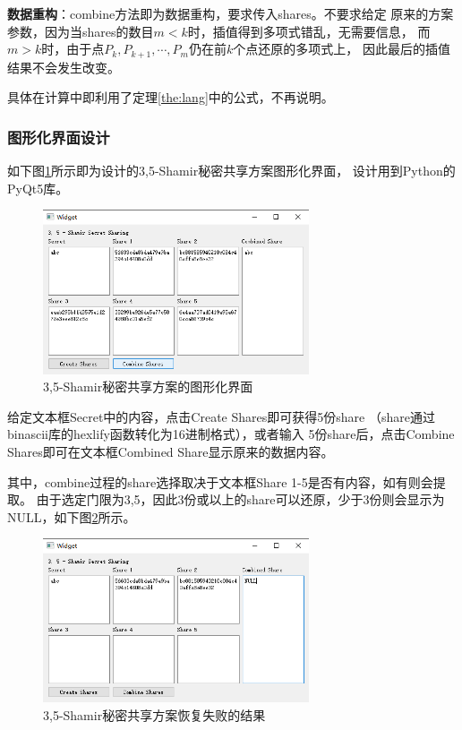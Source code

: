 \textbf{数据重构}：combine方法即为数据重构，要求传入shares。不要求给定
原来的方案参数，因为当shares的数目$m<k$时，插值得到多项式错乱，无需要信息，
而$m>k$时，由于点$P_k, P_{k+1}, \cdots, P_m$仍在前$k$个点还原的多项式上，
因此最后的插值结果不会发生改变。

具体在计算中即利用了定理\ref{the:lang}中的公式，不再说明。

\newpage
\subsubsection{图形化界面设计}

如下图\ref{fig:shamir}所示即为设计的3,5-Shamir秘密共享方案图形化界面，
设计用到Python的PyQt5库。

\begin{figure}[!htbp]
    \centering
    \includegraphics[width=0.7\textwidth]{figures/shamir.png}
    \caption{3,5-Shamir秘密共享方案的图形化界面}
    \label{fig:shamir}
\end{figure}

给定文本框Secret中的内容，点击Create Shares即可获得5份share
（share通过binascii库的hexlify函数转化为16进制格式），或者输入
5份share后，点击Combine Shares即可在文本框Combined Share显示原来的数据内容。

其中，combine过程的share选择取决于文本框Share 1-5是否有内容，如有则会提取。
由于选定门限为3,5，因此3份或以上的share可以还原，少于3份则会显示为NULL，如下图\ref{fig:shamir_2}所示。

\begin{figure}[!htbp]
    \centering
    \includegraphics[width=0.7\textwidth]{figures/shamir_2.png}
    \caption{3,5-Shamir秘密共享方案恢复失败的结果}
    \label{fig:shamir_2}
\end{figure}

